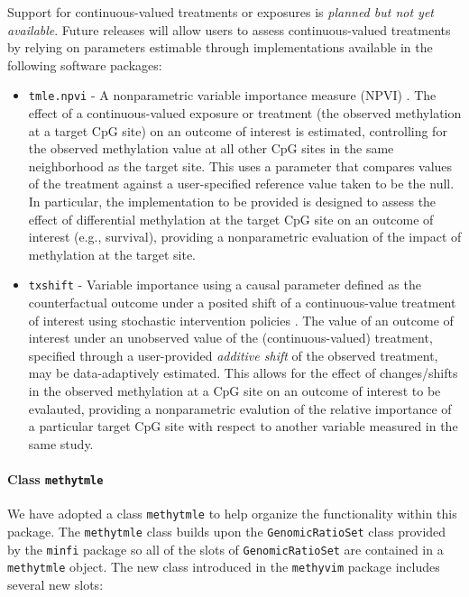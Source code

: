 \documentclass[9pt,a4paper,]{extarticle}
\theoremstyle{definition}
\theoremstyle{definition}
\theoremstyle{definition}
\theoremstyle{remark}
\begin{document}
Support for continuous-valued treatments or exposures is \emph{planned but not yet
available}. Future releases will allow users to assess continuous-valued
treatments by relying on parameters estimable through implementations available
in the following software packages:

\begin{itemize}
\item
  \texttt{tmle.npvi} - A nonparametric variable importance measure (NPVI)
  \citep{chambaz2012estimation}. The effect of a continuous-valued exposure or
  treatment (the observed methylation at a target CpG site) on an outcome of
  interest is estimated, controlling for the observed methylation value at all
  other CpG sites in the same neighborhood as the target site. This uses a
  parameter that compares values of the treatment against a user-specified
  reference value taken to be the null. In particular, the implementation to be
  provided is designed to assess the effect of differential methylation at the
  target CpG site on an outcome of interest (e.g., survival), providing a
  nonparametric evaluation of the impact of methylation at the target site.
\item
  \texttt{txshift} - Variable importance using a causal parameter defined as the
  counterfactual outcome under a posited shift of a continuous-value treatment
  of interest using stochastic intervention policies \citep[
  \citet{diaz2018stochastic}, \citet{hejazi2018txshift}]{munoz2012population}. The value of an outcome of interest
  under an unobserved value of the (continuous-valued) treatment, specified
  through a user-provided \emph{additive shift} of the observed treatment, may be
  data-adaptively estimated. This allows for the effect of changes/shifts in the
  observed methylation at a CpG site on an outcome of interest to be evalauted,
  providing a nonparametric evalution of the relative importance of a particular
  target CpG site with respect to another variable measured in the same study.
\end{itemize}

\hypertarget{class-methytmle}{%
\paragraph{\texorpdfstring{Class \texttt{methytmle}}{Class methytmle}}\label{class-methytmle}}

We have adopted a class \texttt{methytmle} to help organize the functionality within
this package. The \texttt{methytmle} class builds upon the \texttt{GenomicRatioSet} class
provided by the \texttt{minfi} package so all of the slots of \texttt{GenomicRatioSet} are
contained in a \texttt{methytmle} object. The new class introduced in the \texttt{methyvim}
package includes several new slots:
\end{document}
